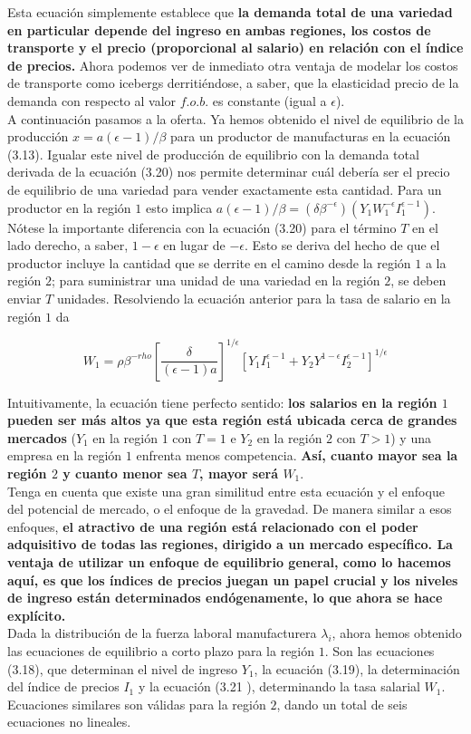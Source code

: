 Esta ecuación simplemente establece que \textbf{la demanda total de una variedad en particular depende del ingreso en ambas regiones, los costos de transporte y el precio (proporcional al salario) en relación con el índice de precios.} Ahora podemos ver de inmediato otra ventaja de modelar los costos de transporte como icebergs derritiéndose, a saber, que la elasticidad precio de la demanda con respecto al valor $f.o.b.$ es constante (igual a $\epsilon$).\\
A continuación pasamos a la oferta. Ya hemos obtenido el nivel de equilibrio de la producción $x = a(\epsilon-1)/\beta$ para un productor de manufacturas en la ecuación (3.13). Igualar este nivel de producción de equilibrio con la demanda total derivada de la ecuación (3.20) nos permite determinar cuál debería ser el precio de equilibrio de una variedad para vender exactamente esta cantidad. Para un productor en la región $1$ esto implica $a(\epsilon-1)/\beta = (\delta \beta^{-\epsilon})(Y_1W_1^{-\epsilon}I_1^{\epsilon-1})$. Nótese la importante diferencia con la ecuación (3.20) para el término $T$ en el lado derecho, a saber, $1-\epsilon$ en lugar de $-\epsilon$. Esto se deriva del hecho de que el productor incluye la cantidad que se derrite en el camino desde la región $1$ a la región $2$; para suministrar una unidad de una variedad en la región $2$, se deben enviar $T$ unidades. Resolviendo la ecuación anterior para la tasa de salario en la región $1$ da

\begin{equation}
    W_1 = \rho\beta^{-rho} \left[\dfrac{\delta}{(\epsilon-1)a}\right]^{1/\epsilon} \left[Y_1I_1^{\epsilon-1}+Y_2Y^{1-\epsilon}I_2^{\epsilon-1}\right]^{1/\epsilon}
\end{equation}

Intuitivamente, la ecuación tiene perfecto sentido: \textbf{los salarios en la región $1$ pueden ser más altos ya que esta región está ubicada cerca de grandes mercados} ($Y_1$ en la región $1$ con $T = 1$ e $Y_2$ en la región $2$ con $T > 1$) y una empresa en la región $1$ enfrenta menos competencia. \textbf{Así, cuanto mayor sea la región $2$ y cuanto menor sea $T$, mayor será $W_1$}. \\
Tenga en cuenta que existe una gran similitud entre esta ecuación y el enfoque del potencial de mercado, o el enfoque de la gravedad. De manera similar a esos enfoques, \textbf{el atractivo de una región está relacionado con el poder adquisitivo de todas las regiones, dirigido a un mercado específico. La ventaja de utilizar un enfoque de equilibrio general, como lo hacemos aquí, es que los índices de precios juegan un papel crucial y los niveles de ingreso están determinados endógenamente, lo que ahora se hace explícito.}\\
Dada la distribución de la fuerza laboral manufacturera $\lambda_i$, ahora hemos obtenido las ecuaciones de equilibrio a corto plazo para la región $1$. Son las ecuaciones (3.18), que determinan el nivel de ingreso $Y_1$, la ecuación (3.19), la determinación del índice de precios $I_1$ y la ecuación (3.21 ), determinando la tasa salarial $W_1$. Ecuaciones similares son válidas para la región $2$, dando un total de seis ecuaciones no lineales.


